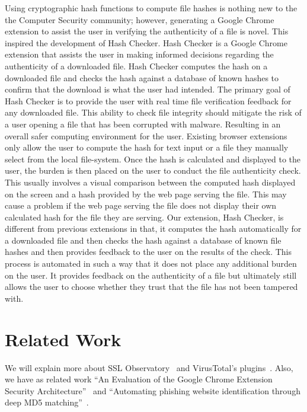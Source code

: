\documentclass[letterpaper,twocolumn,10pt]{article}
\begin{document}
Using cryptographic hash functions to compute file hashes is nothing new to the the Computer Security community; however, generating a Google Chrome extension to assist the user in verifying the authenticity of a file is novel. This inspired the development of Hash Checker. Hash Checker is a Google Chrome extension that assists the user in making informed decisions regarding the authenticity of a downloaded file. Hash Checker computes the hash on a downloaded file and checks the hash against a database of known hashes to confirm that the download is what the user had intended.
	The primary goal of Hash Checker is to provide the user with real time file verification feedback for any downloaded file. This ability to check file integrity should mitigate the risk of a user opening a file that has been corrupted with malware. Resulting in an overall safer computing environment for the user.
	Existing browser extensions only allow the user to compute the hash for text input or a file they manually select from the local file-system. Once the hash is calculated and displayed to the user, the burden is then placed on the user to conduct the file authenticity check. This usually involves a visual comparison between the computed hash displayed on the screen and a hash provided by the web page serving the file. This may cause a problem if the web page serving the file does not display their own calculated hash for the file they are serving. Our extension, Hash Checker, is different from previous extensions in that, it computes the hash automatically for a downloaded file and then checks the hash against a database of known file hashes and then provides feedback to the user on the results of the check. This process is automated in such a way that it does not place any additional burden on the user. It provides feedback on the authenticity of a file but ultimately still allows the user to choose whether they trust that the file has not been tampered with.

\section{Related Work}

We will explain more about SSL Observatory~\cite{ssl-observatory} and VirusTotal's plugins~\cite{vtzilla,vtchromizer,vtexplorer}. Also, we have as related work ``An Evaluation of the Google Chrome Extension Security Architecture''~\cite{180206} and ``Automating phishing website identification through deep MD5 matching''~\cite{Wardman}.
\end{document}

